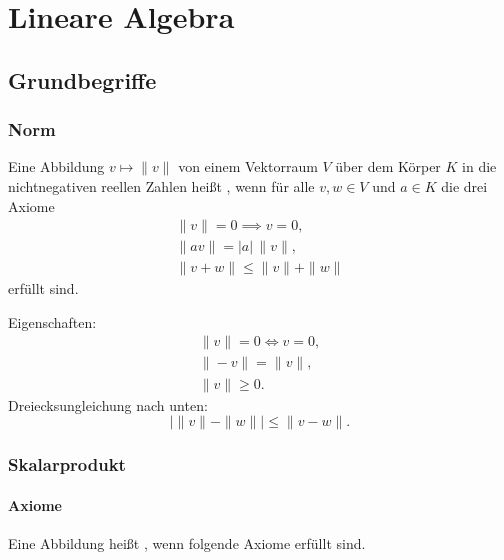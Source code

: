 
\chapter{Lineare Algebra}
\section{Grundbegriffe}
\subsection{Norm}
\begin{Definition}
Eine Abbildung $v\mapsto\|v\|$ von einem
Vektorraum $V$ über dem Körper $K$ in die nichtnegativen reellen
Zahlen heißt , wenn für alle $v,w\in V$ und $a\in K$
die drei Axiome%
\begin{gather}
\|v\|=0 \implies v=0,\\
\|av\| = |a|\,\|v\|,\\
\|v+w\| \le \|v\|+\|w\|
\end{gather}
erfüllt sind.
\end{Definition}

Eigenschaften:
\begin{gather}
\|v\|=0\iff v=0,\\
\|-v\|=\|v\|,\\
\|v\|\ge 0.
\end{gather}
Dreiecksungleichung nach unten:
\begin{equation}
|\|v\|-\|w\||\le \|v-w\|.
\end{equation}

\subsection{Skalarprodukt}

\subsubsection{Axiome}
{}
Eine Abbildung heißt ,
wenn folgende Axiome erfüllt sind.


